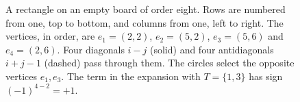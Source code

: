 \begin{figure}[htbp]
\centering
{}
\caption{A rectangle on an empty board of order eight. Rows are numbered from one, top to bottom,
and columns from one, left to right. The vertices, in order, are $e_1=(2,2)$, $e_2=(5,2)$,
$e_3=(5,6)$ and $e_4=(2,6)$. Four diagonals $i-j$ (solid) and four antidiagonals $i+j-1$ (dashed)
pass through them. The circles select the opposite vertices $e_1,e_3$. The term in the expansion with
$T=\{1,3\}$ has sign $(-1)^{4-2}=+1$.}\label{fig:rectangulo}
\end{figure}
